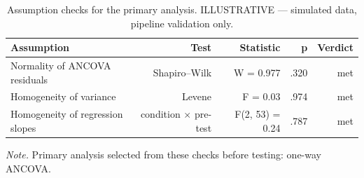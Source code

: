 \begin{table}[htbp]
\centering
\small
\caption{Assumption checks for the primary analysis. ILLUSTRATIVE — simulated data, pipeline validation only.}
\label{tab:T03}
\begin{tabular}{lrrrr}
\toprule
Assumption & Test & Statistic & p & Verdict \\
\midrule
Normality of ANCOVA residuals & Shapiro–Wilk & W = 0.977 & .320 & met \\
Homogeneity of variance & Levene & F = 0.03 & .974 & met \\
Homogeneity of regression slopes & condition $\times$ pre-test & F(2, 53) = 0.24 & .787 & met \\
\bottomrule
\end{tabular}
\par\smallskip\footnotesize\textit{Note.} Primary analysis selected from these checks before testing: one-way ANCOVA.
\end{table}
